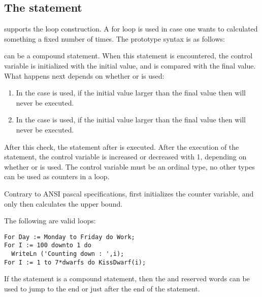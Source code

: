 \documentclass{report}
\begin{document}
\subsection{The  statement}
\fpc supports the  loop construction. A for loop is used in case
one wants to calculated something a fixed number of times.
The prototype syntax is as follows:

 can be a compound statement.
When this statement is encountered, the control variable is initialized with
the initial value, and is compared with the final value.
What happens next depends on whether  or  is used:
\begin{enumerate}
\item In the case  is used, if the initial value larger than the final
value then  will never be executed.
\item In the case  is used, if the initial value larger than the final
value then  will never be executed.
\end{enumerate}
After this check, the statement after  is executed. After the
execution of the statement, the control variable is increased or decreased
with 1, depending on whether  or  is used.
The control variable must be an ordinal type, no other
types can be used as counters in a loop.

\begin{remark}
Contrary to ANSI pascal specifications, \fpc first initializes
the counter variable, and only then calculates the upper bound.
\end{remark}

The following are valid loops:
\begin{verbatim}
For Day := Monday to Friday do Work;
For I := 100 downto 1 do
  WriteLn ('Counting down : ',i);
For I := 1 to 7*dwarfs do KissDwarf(i);
\end{verbatim}

If the statement is a compound statement, then  the  and 
 reserved words can be used to jump to the end or just 
after the end of the  statement.
\end{document}
